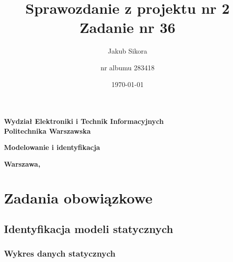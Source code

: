 \documentclass[a4paper,titlepage,11pt,floatssmall]{mwrep}
\title{\bf Sprawozdanie z projektu nr 2\\ Zadanie nr 36  \vskip 0.1cm}
\author{Jakub Sikora \and nr albumu 283418}
\date{\today}
\begin{document}
\makeatletter
\renewcommand{\maketitle}{\begin{titlepage}
		\begin{center}{\LARGE {\bf
					Wydział Elektroniki i Technik Informacyjnych}}\\
			\vspace{0.4cm}
			{\LARGE {\bf Politechnika Warszawska}}\\
			\vspace{0.3cm}
		\end{center}
		\vspace{5cm}
		\begin{center}
			{\bf \LARGE Modelowanie i identyfikacja \vskip 0.1cm}
		\end{center}
		\vspace{1cm}
		\begin{center}
			{\bf \LARGE \@title}
		\end{center}
		\vspace{2cm}
		\begin{center}
			{\bf \Large \@author \par}
		\end{center}
		\vspace*{\stretch{6}}
		\begin{center}
			\bf{\large{Warszawa, \@date\vskip 0.1cm}}
		\end{center}
	\end{titlepage}
	}
\makeatother
\maketitle

\tableofcontents

\chapter{Zadania obowiązkowe}

\section{Identyfikacja modeli statycznych}

\subsection{Wykres danych statycznych}
\end{document}
